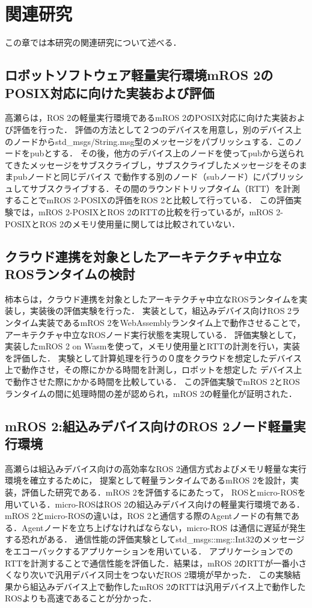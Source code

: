 \chapter{関連研究}
この章では本研究の関連研究について述べる．
\section{ロボットソフトウェア軽量実行環境mROS 2のPOSIX対応に向けた実装および評価}
高瀬らは，ROS 2の軽量実行環境であるmROS 2のPOSIX対応に向けた実装および評価を行った．
評価の方法として２つのデバイスを用意し，別のデバイス上のノードからstd\_msgs/String.msg型のメッセージをパブリッシュする．このノードをpubとする．
その後，他方のデバイス上のノードを使ってpubから送られてきたメッセージをサブスクライブし，サブスクライブしたメッセージをそのままpubノードと同じデバイス
で動作する別のノード（subノード）にパブリッシュしてサブスクライブする．その間のラウンドトリップタイム（RTT）を計測することでmROS 2-POSIXの評価をROS 2と比較して行っている．
この評価実験では，mROS 2-POSIXとROS 2のRTTの比較を行っているが，mROS 2-POSIXとROS 2のメモリ使用量に関しては比較されていない．
\section{クラウド連携を対象としたアーキテクチャ中立なROSランタイムの検討}
柿本らは，クラウド連携を対象としたアーキテクチャ中立なROSランタイムを実装し，実装後の評価実験を行った．
実装として，組込みデバイス向けROS 2ランタイム実装であるmROS 2をWebAssemblyランタイム上で動作させることで，アーキテクチャ中立なROSノード実行状態を実現している．
評価実験として，実装したmROS 2 on Wasmを使って，メモリ使用量とRTTの計測を行い，実装を評価した．
実験として計算処理を行うの０度をクラウドを想定したデバイス上で動作させ，その際にかかる時間を計測し，ロボットを想定した
デバイス上で動作させた際にかかる時間を比較している．
この評価実験でmROS 2とROS ランタイムの間に処理時間の差が認められ，mROS 2の軽量化が証明された．
\section{mROS 2:組込みデバイス向けのROS 2ノード軽量実行環境}
高瀬らは組込みデバイス向けの高効率なROS 2通信方式およびメモリ軽量な実行環境を確立するために，
提案として軽量ランタイムであるmROS 2を設計，実装，評価した研究である．mROS 2を評価するにあたって，
ROSとmicro-ROSを用いている．micro-ROSはROS 2の組込みデバイス向けの軽量実行環境である．
mROS 2とmicro-ROSの違いは，ROS 2と通信する際のAgentノードの有無である．Agentノードを立ち上げなければならない，micro-ROS は通信に遅延が発生する恐れがある．
通信性能の評価実験としてstd\_msgs::msg::Int32のメッセージをエコーバックするアプリケーションを用いている．
アプリケーションでのRTTを計測することで通信性能を評価した．結果は，mROS 2のRTTが一番小さくなり次いで汎用デバイス同士をつないだROS 2環境が早かった．
この実験結果から組込みデバイス上で動作したmROS 2のRTTは汎用デバイス上で動作したROSよりも高速であることが分かった．